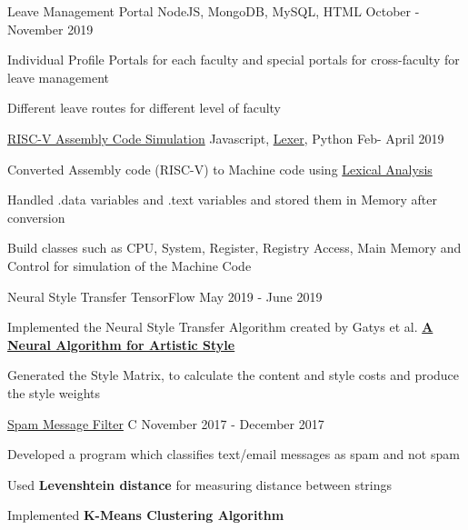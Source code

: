 \begin{cventries}
      \projects
      {} %
      {{Leave Management Portal}} %
      {NodeJS, MongoDB, MySQL, HTML} %
      {October - November 2019} %
      {
        \begin{cvitems} %
          \item {Individual Profile Portals for each faculty and special portals for cross-faculty for leave management}
          \item {Different leave routes for different level of faculty}
        \end{cvitems}
        }
    
    \projects
    {} %
    {\href{https://github.com/vinx-2105/assembly-simulator}{RISC-V Assembly Code Simulation}} %
    {Javascript, \href{https://github.com/aaditmshah/lexer}{Lexer}, Python} %
    {Feb- April 2019} %
    {
      \begin{cvitems} %
        \item {Converted Assembly code (RISC-V) to Machine code using \href{https://github.com/aaditmshah/lexer}{Lexical Analysis}}
        \item {Handled .data variables and .text variables and stored them in Memory after conversion}
        \item {Build classes such as CPU, System, Register, Registry Access, Main Memory and Control for simulation of the Machine Code}
      \end{cvitems}
      }
      
      \projects
    {} %
    {{Neural Style Transfer}} %
    {TensorFlow} %
    {May 2019 - June 2019} %
    {
      \begin{cvitems} %
        \item {Implemented the Neural Style Transfer Algorithm created by Gatys et al. \href{https://arxiv.org/abs/1508.06576}{\textbf{A Neural Algorithm for Artistic Style}}}
        \item {Generated the Style Matrix, to calculate the content and style costs and produce the style weights}
      \end{cvitems}
    }
      
      \projects
      {} %
      {\href{https://github.com/parthgoyal123/Queen-McCluskey}{Spam Message Filter}} %
      {C} %
      {November 2017 - December 2017} %
      {
        \begin{cvitems} %
          \item {Developed a program which classifies text/email messages as spam and not spam}
          \item {Used \textbf{Levenshtein distance} for measuring distance between strings} 
          \item {Implemented \textbf{K-Means Clustering Algorithm}}
        \end{cvitems}
        }



\end{cventries}

